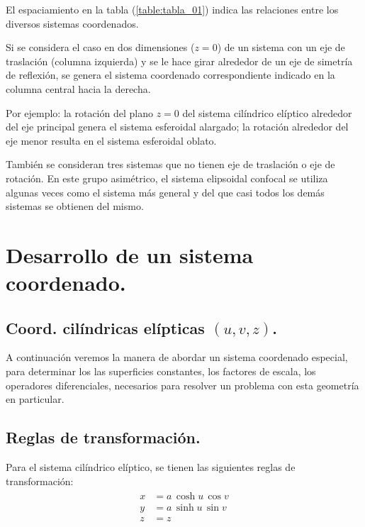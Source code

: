 El espaciamiento en la tabla (\ref{table:tabla_01}) indica las relaciones entre los diversos sistemas coordenados.
\par
Si se considera el caso en dos dimensiones ($z = 0$) de un sistema con un eje de traslación (columna izquierda) y se le hace girar alrededor de un eje de simetría de reflexión, se genera el sistema coordenado correspondiente indicado en la columna central hacia la derecha.
\par
Por ejemplo: la rotación del plano $z = 0$ del sistema cilíndrico elíptico alrededor del eje principal genera el sistema esferoidal alargado; la rotación alrededor del eje menor resulta en el sistema esferoidal oblato.
\par
También se consideran tres sistemas que no tienen eje de traslación o eje de rotación. En este grupo asimétrico, el sistema elipsoidal confocal se utiliza algunas veces como el sistema más general y del que casi todos los demás sistemas se obtienen del mismo.

\section{Desarrollo de un sistema coordenado.}

\subsection{Coord. cilíndricas elípticas \texorpdfstring{$(u, v, z)$}{(u, v, z)}.}

A continuación veremos la manera de abordar un sistema coordenado especial, para determinar los las superficies constantes, los factores de escala, los operadores diferenciales, necesarios para resolver un problema con esta geometría en particular.

\subsection{Reglas de transformación.}

Para el sistema cilíndrico elíptico, se tienen las siguientes reglas de transformación:
\begin{align}
\begin{aligned}
x &= a \, \cosh u \, \cos v \\
y &= a \, \sinh u \, \sin v \\
z &= z
\end{aligned}
\label{eq:ecuacion_02_73_esp}
\end{align}

